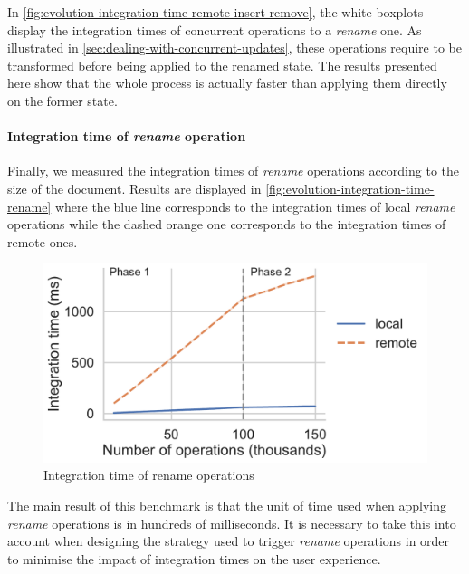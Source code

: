 \documentclass[sigplan,10pt,authorversion]{acmart}
\begin{document}
In \autoref{fig:evolution-integration-time-remote-insert-remove}, the white boxplots display the integration times of concurrent operations to a \emph{rename} one.
As illustrated in \autoref{sec:dealing-with-concurrent-updates}, these operations require to be transformed before being applied to the renamed state.
The results presented here show that the whole process is actually faster than applying them directly on the former state.

\paragraph{Integration time of \emph{rename} operation}

Finally, we measured the integration times of \emph{rename} operations according to the size of the document.
Results are displayed in \autoref{fig:evolution-integration-time-rename} where the blue line corresponds to the integration times of local \emph{rename} operations while the dashed orange one corresponds to the integration times of remote ones.

\begin{figure}[ht!]
    \centering
    \includegraphics[width=0.9\columnwidth]{img/integration-time-rename.pdf}
    \caption{Integration time of rename operations}
    \label{fig:evolution-integration-time-rename}
\end{figure}

The main result of this benchmark is that the unit of time used when applying \emph{rename} operations is in hundreds of milliseconds.
It is necessary to take this into account when designing the strategy used to trigger \emph{rename} operations in order to minimise the impact of integration times on the user experience.

\end{document}
